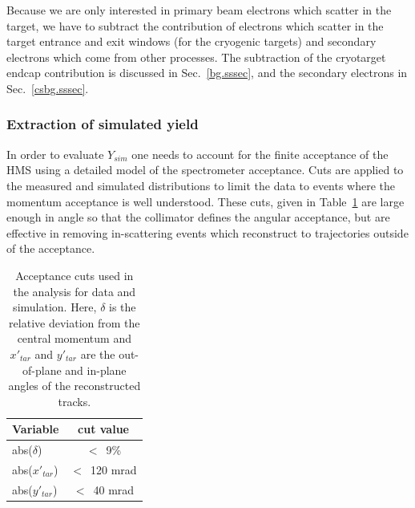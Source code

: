 Because we are only interested in primary beam electrons which scatter
in the target, we have to subtract the contribution of electrons which
scatter in the target entrance and exit windows (for the cryogenic targets)
and secondary electrons which come from other processes. The subtraction of
the cryotarget endcap contribution is discussed in Sec.~\ref{bg.sssec}, and the
secondary electrons in Sec.~\ref{csbg.sssec}.

\subsubsection{Extraction of simulated yield}\label{simyield.sssec}

In order to evaluate $Y_{sim}$ one needs to account for the finite acceptance
of the HMS using a detailed model of the spectrometer acceptance. Cuts
are applied to the measured and simulated distributions to limit the data to
events where the momentum acceptance is well understood.  These cuts, given in
Table~\ref{acccuts.tab} are large enough in angle so that the collimator
defines the angular acceptance, but are effective in removing in-scattering
events which reconstruct to trajectories outside of the acceptance.

\begin{table}[htb]
\caption{Acceptance cuts used in the analysis for data and simulation. Here,
$\delta$ is the relative deviation from the central momentum and $x'_{tar}$
and $y'_{tar}$ are the out-of-plane and in-plane angles of the reconstructed
tracks.}

 \begin{center}
 \begin{tabular}{|l|c|}
	 \hline
	 Variable & cut value \\
	 \hline
 abs($\delta$) & $<$~9\% \\
 abs($x'_{tar}$) & $<$~120 mrad\\
 abs($y'_{tar}$) & $<$~40 mrad \\
	 \hline
 \end{tabular}
 \end{center}
\label{acccuts.tab}
\end{table}

